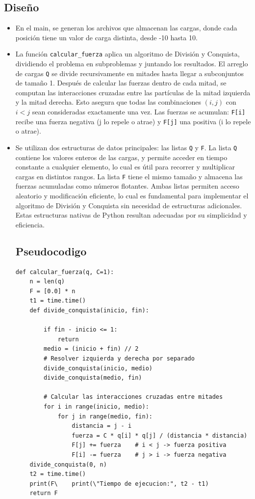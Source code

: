\documentclass[a4paper, 12pt]{article}
\begin{document}
\subsection{Diseño}
\begin{itemize}
\item En el main, se generan los archivos que almacenan las cargas, donde cada posición tiene un valor de carga distinta, desde -10 hasta 10.
\item La función \texttt{calcular\_fuerza} aplica un algoritmo de División y Conquista, dividiendo el problema en subproblemas y juntando los resultados. El arreglo de cargas \texttt{Q} se divide recursivamente en mitades hasta llegar a subconjuntos de tamaño 1. Después de calcular las fuerzas dentro de cada mitad, se computan las interacciones cruzadas entre las partículas de la mitad izquierda y la mitad derecha. Esto asegura que todas las combinaciones $(i, j)$ con $i < j$ sean consideradas exactamente una vez. Las fuerzas se acumulan: \texttt{F[i]} recibe una fuerza negativa (j lo repele o atrae) y \texttt{F[j]} una positiva (i lo repele o atrae).
\item Se utilizan dos estructuras de datos principales: las listas \texttt{Q} y \texttt{F}. La lista \texttt{Q} contiene los valores enteros de las cargas, y permite acceder en tiempo constante a cualquier elemento, lo cual es útil para recorrer y multiplicar cargas en distintos rangos. La lista \texttt{F} tiene el mismo tamaño y almacena las fuerzas acumuladas como números flotantes. Ambas listas permiten acceso aleatorio y modificación eficiente, lo cual es fundamental para implementar el algoritmo de División y Conquista sin necesidad de estructuras adicionales. Estas estructuras nativas de Python resultan adecuadas por su simplicidad y eficiencia.

\newpage
\subsection{Pseudocodigo}
	\begin{lstlisting}[frame=single]
def calcular_fuerza(q, C=1):
    n = len(q)
    F = [0.0] * n
    t1 = time.time()
    def divide_conquista(inicio, fin):

        if fin - inicio <= 1:
            return
        medio = (inicio + fin) // 2
        # Resolver izquierda y derecha por separado
        divide_conquista(inicio, medio)
        divide_conquista(medio, fin)

        # Calcular las interacciones cruzadas entre mitades
        for i in range(inicio, medio):
            for j in range(medio, fin):
                distancia = j - i
                fuerza = C * q[i] * q[j] / (distancia * distancia)
                F[j] += fuerza    # i < j -> fuerza positiva
                F[i] -= fuerza    # j > i -> fuerza negativa
    divide_conquista(0, n)
    t2 = time.time()
    print(F\    print(\"Tiempo de ejecucion:", t2 - t1)
    return F
	\end{lstlisting}
\end{itemize}
\end{document}
